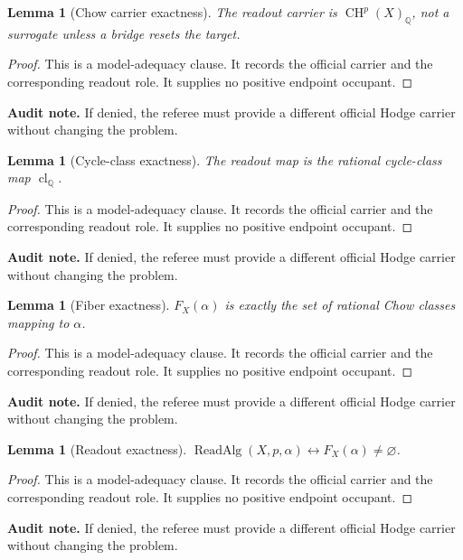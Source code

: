 \documentclass[11pt]{article}
\newtheorem{lemma}[theorem]{Lemma}
\newcommand{\QQ}{\mathbb{Q}}
\newcommand{\CH}{\operatorname{CH}}
\newcommand{\clQ}{\operatorname{cl}_{\QQ}}
\newcommand{\ReadAlg}{\operatorname{ReadAlg}}
\begin{document}
\begin{lemma}[Chow carrier exactness]
The readout carrier is $\CH^p(X)_\QQ$, not a surrogate unless a bridge resets the target.
\end{lemma}
\begin{proof}
This is a model-adequacy clause. It records the official carrier and the corresponding readout role. It supplies no positive endpoint occupant.
\end{proof}
\par\noindent\textbf{Audit note.} If denied, the referee must provide a different official Hodge carrier without changing the problem.


\begin{lemma}[Cycle-class exactness]
The readout map is the rational cycle-class map $\clQ$.
\end{lemma}
\begin{proof}
This is a model-adequacy clause. It records the official carrier and the corresponding readout role. It supplies no positive endpoint occupant.
\end{proof}
\par\noindent\textbf{Audit note.} If denied, the referee must provide a different official Hodge carrier without changing the problem.


\begin{lemma}[Fiber exactness]
$F_X(\alpha)$ is exactly the set of rational Chow classes mapping to $\alpha$.
\end{lemma}
\begin{proof}
This is a model-adequacy clause. It records the official carrier and the corresponding readout role. It supplies no positive endpoint occupant.
\end{proof}
\par\noindent\textbf{Audit note.} If denied, the referee must provide a different official Hodge carrier without changing the problem.


\begin{lemma}[Readout exactness]
$\ReadAlg(X,p,\alpha)\leftrightarrow F_X(\alpha)\neq\varnothing$.
\end{lemma}
\begin{proof}
This is a model-adequacy clause. It records the official carrier and the corresponding readout role. It supplies no positive endpoint occupant.
\end{proof}
\par\noindent\textbf{Audit note.} If denied, the referee must provide a different official Hodge carrier without changing the problem.
\end{document}
